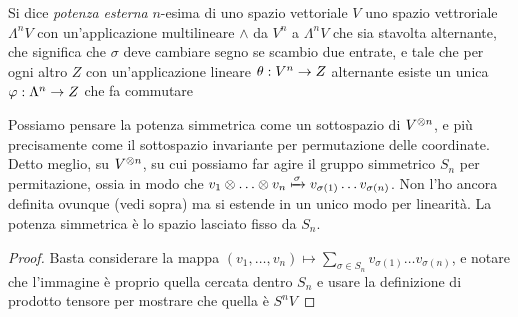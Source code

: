   \begin{mydef}
   Si dice \emph{potenza esterna} $n$-esima di uno spazio vettoriale $V$ uno spazio vettroriale $\Lambda^nV$ con un'applicazione multilineare $\wedge$ da $V^n$ a $\Lambda^nV$ che sia stavolta alternante, che significa che $\sigma$ deve cambiare segno se scambio due entrate, e tale che per ogni altro $Z$ con un'applicazione lineare $\theta: V^n \rightarrow Z$ alternante esiste un unica $\varphi: \Lambda^n \rightarrow Z$ che fa commutare 
   
  
  \end{mydef}
  
  \begin{myobs}
   Possiamo pensare la potenza simmetrica come un sottospazio di $V^{\otimes n}$, e più precisamente come il sottospazio invariante per permutazione delle coordinate. Detto meglio, su $V^{\otimes n}$, su cui possiamo far agire il gruppo simmetrico $S_n$ per permitazione, ossia in modo che $v_1 \tensor \dots \tensor v_n \xmapsto{\sigma} v_{\sigma(1)} \dots v_{\sigma(n)}$. Non l'ho ancora definita ovunque (vedi sopra) ma si estende in un unico modo per linearità. La potenza simmetrica è lo spazio lasciato fisso da $S_n$.
  \end{myobs}

  \begin{proof}
   Basta considerare la mappa $(v_1,\dots,v_n) \mapsto \sum_{\sigma \in S_n} v_{\sigma(1)} \dots v_{\sigma(n)}$, e notare che l'immagine è proprio quella cercata dentro $S_n$ e usare la definizione di prodotto tensore per mostrare che quella è $S^nV$
  \end{proof}


